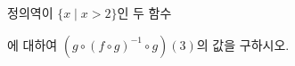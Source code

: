 \hspace*{2mm}\begin{minipage}[t]{\dimexpr\linewidth-2mm\relax}\vspace{0pt}
정의역이 $\{x \mid x>2\}$인 두 함수 \par\smallskip{}\par\smallskip\noindent 에 대하여 $(g\circ(f\circ g)^{-1}\circ g)(3)$의 값을 구하시오.\end{minipage}
